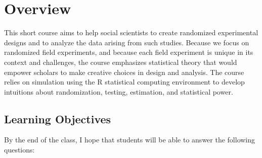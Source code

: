 \documentclass[letterpaper]{inzane_syllabus} %
\begin{document}

\makeprofile%

\section{Overview}

This short course aims to help social scientists to create randomized
experimental designs and to analyze the data arising from such studies.
Because we focus on randomized field experiments, and because each field
experiment is unique in its context and challenges, the course emphasizes
statistical theory that would empower scholars to make creative choices in
design and analysis. The course relies on simulation using the R statistical
computing environment to develop intuitions about randomization, testing,
estimation, and statistical power.



\subsection{Learning Objectives}

By the end of the class, I hope that students will be able to answer the following questions:
\end{document}
